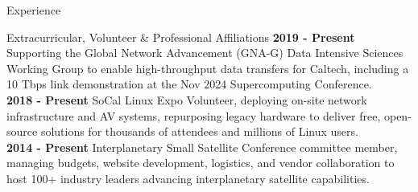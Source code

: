 \documentclass{resume} %
\begin{document}
\begin{rSection}{Experience}



\begin{rSection}{ Extracurricular, Volunteer \& Professional Affiliations}
	{\bf 2019 - Present} Supporting the Global Network Advancement (GNA-G) Data Intensive Sciences Working Group to enable high-throughput data transfers for Caltech, including a 10 Tbps link demonstration at the Nov 2024 Supercomputing Conference.\\
{\bf 2018 - Present} SoCal Linux Expo Volunteer, deploying on-site network infrastructure and AV systems, repurposing legacy hardware to deliver free, open-source solutions for thousands of attendees and millions of Linux users.\\
{\bf 2014 - Present} Interplanetary Small Satellite Conference committee member, managing budgets, website development, logistics, and vendor collaboration to host 100+ industry leaders advancing interplanetary satellite capabilities.\\
\end{rSection}





\end{rSection}
\end{document}
